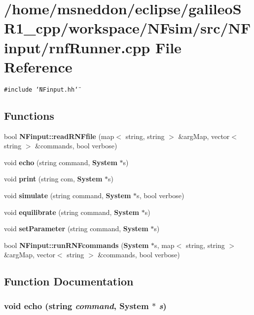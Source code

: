 \section{/home/msneddon/eclipse/galileoSR1\_\-cpp/workspace/NFsim/src/NFinput/rnfRunner.cpp File Reference}
\label{rnfRunner_8cpp}


{\tt \#include \char`\"{}NFinput.hh\char`\"{}}\par
\subsection*{Functions}
\begin{CompactItemize}
\item 
bool {\bf NFinput::readRNFfile} (map$<$ string, string $>$ \&argMap, vector$<$ string $>$ \&commands, bool verbose)
\item 
void {\bf echo} (string command, {\bf System} $\ast$s)
\item 
void {\bf print} (string com, {\bf System} $\ast$s)
\item 
void {\bf simulate} (string command, {\bf System} $\ast$s, bool verbose)
\item 
void {\bf equilibrate} (string command, {\bf System} $\ast$s)
\item 
void {\bf setParameter} (string command, {\bf System} $\ast$s)
\item 
bool {\bf NFinput::runRNFcommands} ({\bf System} $\ast$s, map$<$ string, string $>$ \&argMap, vector$<$ string $>$ \&commands, bool verbose)
\end{CompactItemize}


\subsection{Function Documentation}
\subsubsection{\setlength{\rightskip}{0pt plus 5cm}void echo (string {\em command}, {\bf System} $\ast$ {\em s})}\label{rnfRunner_8cpp_b9195e4e490de9bb49a6087159f657f7}


